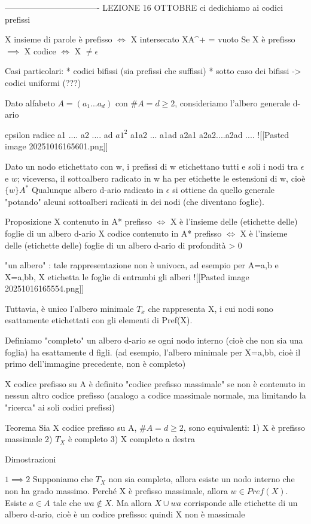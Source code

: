 ----------------------------------
LEZIONE 16 OTTOBRE
ci dedichiamo ai codici prefissi

X insieme di parole è prefisso $\iff$ X intersecato XA^+ = vuoto
Se X è prefisso $\implies$  X codice $\iff$ X $\neq {\epsilon}$

Casi particolari:
* codici bifissi (sia prefissi che suffissi)
* sotto caso dei bifissi -> codici uniformi (???)

Dato alfabeto $A=(a_1...a_d)$ con $\#A=d \ge 2$, consideriamo l'albero generale d-ario

epsilon radice
a1 ....                            a2 ....                          ad
$a1^2$ a1a2 ... a1ad     a2a1 a2a2....a2ad          ....
![[Pasted image 20251016165601.png]]

Dato un nodo etichettato con w, i prefissi di w etichettano tutti e soli i nodi tra $\epsilon$ e $w$; viceversa, il sottoalbero radicato in w ha per etichette le estensioni di w, cioè $\{w\}A^*$
Qualunque albero d-ario radicato in $\epsilon$ si ottiene da quello generale "potando" alcuni sottoalberi radicati in dei nodi (che diventano foglie).

Proposizione
X contenuto in A* prefisso $\iff$ X è l'insieme delle (etichette delle) foglie di un albero d-ario
X codice contenuto in A* prefisso $\iff$ X è l'insieme delle (etichette delle) foglie di un albero d-ario di profondità > 0

"un albero" : tale rappresentazione non è univoca, ad esempio per A={a,b} e X={a,bb}, X etichetta le foglie di entrambi gli alberi
![[Pasted image 20251016165554.png]]

Tuttavia, è unico l'albero minimale $T_x$ che rappresenta X, i cui nodi sono esattamente etichettati con gli elementi di Pref(X).

Definiamo "completo" un albero d-ario se ogni nodo interno (cioè che non sia una foglia) ha esattamente d figli.
(ad esempio, l'albero minimale per X={a,bb}, cioè il primo dell'immagine precedente, non è completo)

X codice prefisso su A è definito "codice prefisso massimale" se non è contenuto in nessun altro codice prefisso (analogo a codice massimale normale, ma limitando la "ricerca" ai soli codici prefissi)

Teorema
Sia X codice prefisso su A, $\#A=d \ge 2$, sono equivalenti:
1) X è prefisso massimale
2) $T_X$ è completo
3) X completo a destra

Dimostrazioni

$1\implies 2$
Supponiamo che $T_X$ non sia completo, allora esiste un nodo interno che non ha grado massimo.
Perché X è prefisso massimale, allora $w \in Pref(X)$.
Esiste $a \in A$ tale che $wa \notin X$.
Ma allora $X\cup {wa}$ corrisponde alle etichette di un albero d-ario, cioè è un codice prefisso: quindi X non è massimale
 
